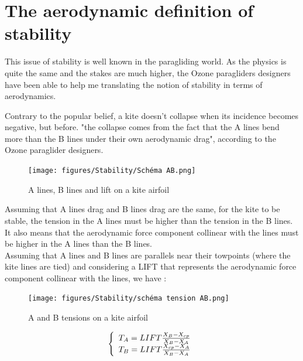 
\section{The aerodynamic definition of stability}
\label{sec:Ch3.1}

This issue of stability is well known in the paragliding world. As the physics is quite the same and the stakes are much higher, the Ozone paragliders designers have been able to help me translating the notion of stability in terms of aerodynamics. 

Contrary to the popular belief, a kite doesn't collapse when its incidence becomes negative, but before. "the collapse comes from the fact that the A lines bend more than the B lines under their own aerodynamic drag", according to the Ozone paraglider designers. \\

\begin{figure}
\centering
    \texttt{[image: figures/Stability/Schéma AB.png]}
    \caption{A lines, B lines and lift on a kite airfoil}
    \label{fig:A lines, B lines and lift on an airfoil}
\end{figure}
Assuming that A lines drag and B lines drag are the same, for the kite to be stable, the tension in the A lines must be higher than the tension in the B lines. It also means that the aerodynamic force component collinear with the lines must be higher in the A lines than the B lines.\\

Assuming that A lines and B lines are parallels near their towpoints (where the kite lines are tied) and considering a LIFT that represents the aerodynamic force component collinear with the lines, we have : 

\begin{figure}[H]
\centering
    \texttt{[image: figures/Stability/schéma tension AB.png]}
    \caption{A and B tensions on a kite airfoil}
    \label{fig:A and B tensions on a kite airfoil}
\end{figure}

\begin{equation}
\left \{
    \begin{array}{r c l}
        T_{A} = LIFT \frac{X_{B} - X_{cp}}{X_{B} - X_{A}} \\
        T_{B} = LIFT \frac{X_{cp} - X_{A}}{X_{B} - X_{A}} 
    \end{array}
    \right .
   \label{tension AB}
\end{equation}

